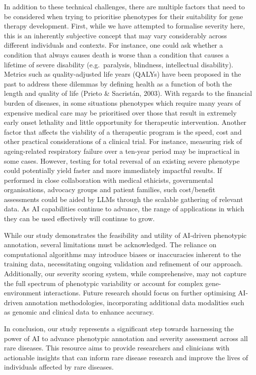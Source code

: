 \documentclass[
]{agujournal2019}
\begin{document}
In addition to these technical challenges, there are multiple factors
that need to be considered when trying to prioritise phenotypes for
their suitability for gene therapy development. First, while we have
attempted to formalise severity here, this is an inherently subjective
concept that may vary considerably across different individuals and
contexts. For instance, one could ask whether a condition that always
causes death is worse than a condition that causes a lifetime of severe
disability (e.g.~paralysis, blindness, intellectual disability). Metrics
such as quality-adjusted life years (QALYs) have been proposed in the
past to address these dilemmas by defining health as a function of both
the length and quality of life (Prieto \& Sacristán, 2003). With regards
to the financial burden of diseases, in some situations phenotypes which
require many years of expensive medical care may be prioritised over
those that result in extremely early onset lethality and little
opportunity for therapeutic intervention. Another factor that affects
the viability of a therapeutic program is the speed, cost and other
practical considerations of a clinical trial. For instance, measuring
risk of ageing-related respiratory failure over a ten-year period may be
impractical in some cases. However, testing for total reversal of an
existing severe phenotype could potentially yield faster and more
immediately impactful results. If performed in close collaboration with
medical ethicists, governmental organisations, advocacy groups and
patient families, such cost/benefit assessments could be aided by LLMs
through the scalable gathering of relevant data. As AI capabilities
continue to advance, the range of applications in which they can be used
effectively will continue to grow.

While our study demonstrates the feasibility and utility of AI-driven
phenotypic annotation, several limitations must be acknowledged. The
reliance on computational algorithms may introduce biases or
inaccuracies inherent to the training data, necessitating ongoing
validation and refinement of our approach. Additionally, our severity
scoring system, while comprehensive, may not capture the full spectrum
of phenotypic variability or account for complex gene-environment
interactions. Future research should focus on further optimising
AI-driven annotation methodologies, incorporating additional data
modalities such as genomic and clinical data to enhance accuracy.

In conclusion, our study represents a significant step towards
harnessing the power of AI to advance phenotypic annotation and severity
assessment across all rare diseases. This resource aims to provide
researchers and clinicians with actionable insights that can inform rare
disease research and improve the lives of individuals affected by rare
diseases.
\end{document}
